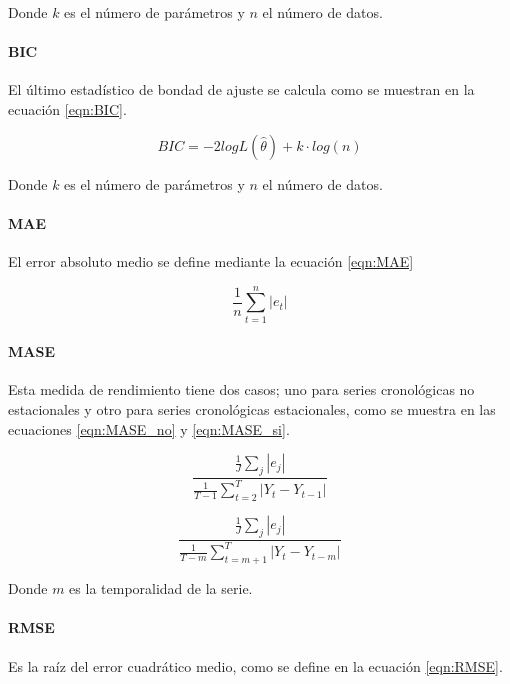 \documentclass[
]{article}
\begin{document}
Donde \(k\) es el número de parámetros y \(n\) el número de datos.

\paragraph{BIC}

El último estadístico de bondad de ajuste se calcula como se muestran en
la ecuación \eqref{eqn:BIC}.

\begin{equation}
\label{eqn:BIC}
BIC=-2logL\left(\hat\theta\right)+k\cdot log(n)
\end{equation}

Donde \(k\) es el número de parámetros y \(n\) el número de datos.

\paragraph{MAE}

El error absoluto medio se define mediante la ecuación \eqref{eqn:MAE}

\begin{equation}
\label{eqn:MAE}
\frac{1}{n}\sum_{t=1}^n |e_t|
\end{equation}

\paragraph{MASE}

Esta medida de rendimiento tiene dos casos; uno para series cronológicas
no estacionales y otro para series cronológicas estacionales, como se
muestra en las ecuaciones \eqref{eqn:MASE_no} y \eqref{eqn:MASE_si}.

\begin{equation}
\label{eqn:MASE_no}
\frac{\frac{1}{J}\sum_j|e_j|}{\frac{1}{T-1}\sum_{t=2}^T|Y_t-Y_{t-1}|}
\end{equation}

\begin{equation}
\label{eqn:MASE_si}
\frac{\frac{1}{J}\sum_j|e_j|}{\frac{1}{T-m}\sum_{t=m+1}^T|Y_t-Y_{t-m}|}
\end{equation}

Donde \(m\) es la temporalidad de la serie.

\paragraph{RMSE}

Es la raíz del error cuadrático medio, como se define en la ecuación
\eqref{eqn:RMSE}.
\end{document}
